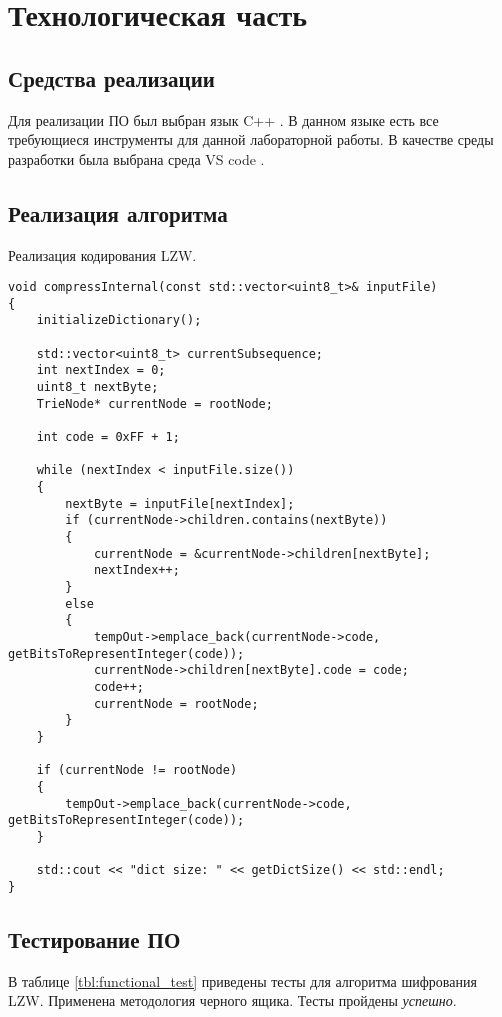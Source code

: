 \chapter{Технологическая часть}

\section{Средства реализации}

Для реализации ПО был выбран язык C++ \cite{C++}.
В данном языке есть все требующиеся инструменты для данной лабораторной работы.
В качестве среды разработки была выбрана среда VS code \cite{vscode}.

\section{Реализация алгоритма}

Реализация кодирования LZW.

\begin{lstlisting}
void compressInternal(const std::vector<uint8_t>& inputFile)
{
    initializeDictionary();

    std::vector<uint8_t> currentSubsequence;
    int nextIndex = 0;
    uint8_t nextByte;
    TrieNode* currentNode = rootNode;

    int code = 0xFF + 1;

    while (nextIndex < inputFile.size())
    {
        nextByte = inputFile[nextIndex];
        if (currentNode->children.contains(nextByte))
        {
            currentNode = &currentNode->children[nextByte];
            nextIndex++;
        }
        else
        {
            tempOut->emplace_back(currentNode->code, getBitsToRepresentInteger(code));
            currentNode->children[nextByte].code = code;
            code++;
            currentNode = rootNode;
        }
    }

    if (currentNode != rootNode)
    {
        tempOut->emplace_back(currentNode->code, getBitsToRepresentInteger(code));
    }

    std::cout << "dict size: " << getDictSize() << std::endl;
}
\end{lstlisting}

\section{Тестирование ПО}

В таблице \ref{tbl:functional_test} приведены тесты для алгоритма шифрования LZW. 
Применена методология черного ящика. Тесты пройдены \textit{успешно}.

